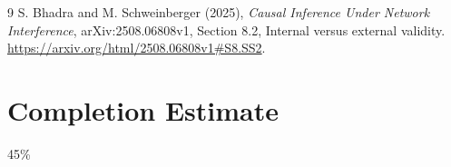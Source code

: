 \documentclass[11pt]{article}
\theoremstyle{remark}
\begin{document}
\begin{thebibliography}{9}
 S. Bhadra and M. Schweinberger (2025),
\emph{Causal Inference Under Network Interference}, arXiv:2508.06808v1,
Section 8.2, Internal versus external validity.
\url{https://arxiv.org/html/2508.06808v1#S8.SS2}.
\end{thebibliography}

\section{Completion Estimate}
45\%
\end{document}
